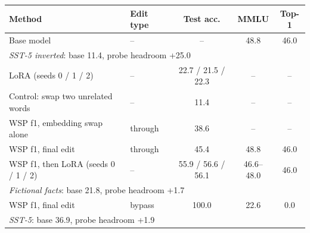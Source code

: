 \begin{tabular}{llccc}
\toprule
Method & Edit type & Test acc. & MMLU & Top-1 \\
\midrule
Base model & -- & -- & 48.8 & 46.0 \\
\multicolumn{5}{l}{\textit{SST-5 inverted}: base 11.4, probe headroom +25.0} \\
\quad LoRA (seeds 0 / 1 / 2) & -- & 22.7 / 21.5 / 22.3 & -- & -- \\
\quad Control: swap two unrelated words & -- & 11.4 & -- & -- \\
\quad WSP f1, embedding swap alone & through & 38.6 & -- & -- \\
\quad WSP f1, final edit & through & 45.4 & 48.8 & 46.0 \\
\quad WSP f1, then LoRA (seeds 0 / 1 / 2) & -- & 55.9 / 56.6 / 56.1 & 46.6--48.0 & 46.0 \\
\multicolumn{5}{l}{\textit{Fictional facts}: base 21.8, probe headroom +1.7} \\
\quad WSP f1, final edit & bypass & 100.0 & 22.6 & 0.0 \\
\multicolumn{5}{l}{\textit{SST-5}: base 36.9, probe headroom +1.9} \\
\bottomrule
\end{tabular}
